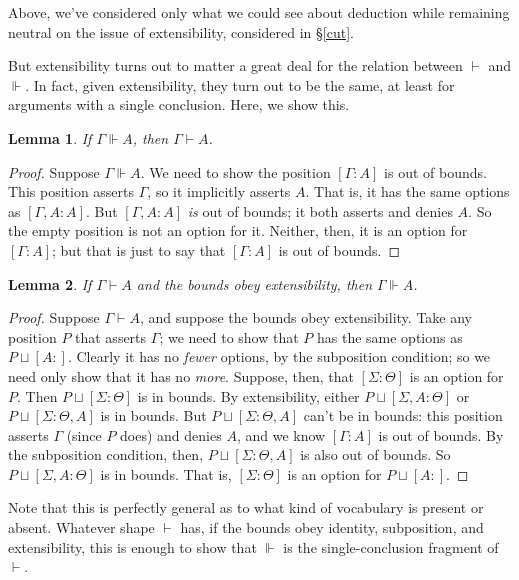 \documentclass{article}
\newcommand{\G}{\ensuremath{\Gamma}}
\newcommand{\Sig}{\ensuremath{\Sigma}}
\newcommand{\pcup}{\ensuremath{\sqcup}}
\newcommand{\pos}[2]{\ensuremath{[#1:#2]}}
\newcommand{\cns}{\vdash}
\newcommand{\ded}{\Vdash}
\newtheorem{lem}{Lemma}
\begin{document}
Above, we've considered only what we could see about deduction while remaining neutral on the issue of extensibility, considered in \S\ref{cut}.

But extensibility turns out to matter a great deal for the relation between $\cns$ and $\ded$.
In fact, given extensibility, they turn out to be the same, at least for arguments with a single conclusion. 
Here, we show this.

\begin{lem}
If $\G \ded A$, then $\G \cns A$.
\end{lem}

\begin{proof}
Suppose $\G \ded A$. 
We need to show the position $\pos{\G}{A}$ is out of bounds.
This position asserts $\G$, so it implicitly asserts $A$. 
That is, it has the same options as $\pos{\G, A}{A}$.
But $\pos{\G, A}{A}$ {\em is} out of bounds; it both asserts and denies $A$.
So the empty position is not an option for it.
Neither, then, it is an option for $\pos{\G}{A}$; but that is just to say that $\pos{\G}{A}$ is out of bounds.
\end{proof}

\begin{lem}
If $\G \cns A$ and the bounds obey extensibility, then $\G \ded A$.
\end{lem}

\begin{proof}
Suppose $\G \cns A$, and suppose the bounds obey extensibility.
Take any position $P$ that asserts $\G$; we need to show that $P$ has the same options as $P \pcup \pos{A}{}$.
Clearly it has no {\em fewer} options, by the subposition condition; so we need only show that it has no {\em more}.
Suppose, then, that $\pos{\Sig}{\Theta}$ is an option for $P$.
Then $P \pcup \pos{\Sig}{\Theta}$ is in bounds.
By extensibility, either $P \pcup \pos{\Sig, A}{\Theta}$ or $P \pcup \pos{\Sig}{\Theta, A}$ is in bounds.
But $P \pcup \pos{\Sig}{\Theta, A}$ can't be in bounds: this position asserts $\G$ (since $P$ does) and denies $A$, and we know $\pos{\G}{A}$ is out of bounds.
By the subposition condition, then, $P \pcup \pos{\Sig}{\Theta, A}$ is also out of bounds.
So $P \pcup \pos{\Sig, A}{\Theta}$ is in bounds.
That is, $\pos{\Sig}{\Theta}$ is an option for $P \pcup \pos{A}{}$.
\end{proof}

Note that this is perfectly general as to what kind of vocabulary is present or absent.
Whatever shape $\cns$ has, if the bounds obey identity, subposition, and extensibility, this is enough to show that $\ded$ is the single-conclusion fragment of $\cns$.
\end{document}
